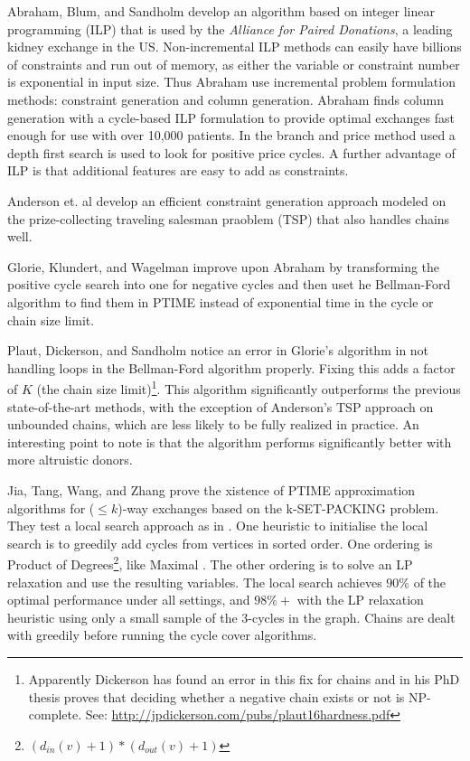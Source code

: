 \documentclass[main.tex]{subfiles}
\begin{document}
Abraham, Blum, and Sandholm \cite{Abr1} develop an algorithm based on integer linear programming (ILP) that is used by the \textit{Alliance for Paired Donations}, a leading kidney exchange in the US. Non-incremental ILP methods can easily have billions of constraints and run out of memory, as either the variable or constraint number is exponential in input size. Thus Abraham use incremental problem formulation methods: constraint generation and column generation. Abraham finds column generation with a cycle-based ILP formulation to provide optimal exchanges fast enough for use with over 10,000 patients. In the branch and price method used a depth first search is used to look for positive price cycles. A further advantage of ILP is that additional features are easy to add as constraints.

Anderson et. al \cite{And3} develop an efficient constraint generation approach modeled on the prize-collecting traveling salesman praoblem (TSP) that also handles chains well.

Glorie, Klundert, and Wagelman \cite{Glo1} improve upon Abraham \cite{Abr1} by transforming the positive cycle search into one for negative cycles and then uset he Bellman-Ford algorithm to find them in PTIME instead of exponential time in the cycle or chain size limit.

Plaut, Dickerson, and Sandholm \cite{Pla} notice an error in Glorie's algorithm \cite{Glo1} in not handling loops in the Bellman-Ford algorithm properly. Fixing this adds a factor of $K$ (the chain size limit)\footnote{Apparently Dickerson has found an error in this fix for chains and in his PhD thesis \cite{Dick} proves that deciding whether a negative chain exists or not is NP-complete. See: \url{http://jpdickerson.com/pubs/plaut16hardness.pdf}}. This algorithm significantly outperforms the previous state-of-the-art methods, with the exception of Anderson's TSP approach \cite{And3} on unbounded chains, which are less likely to be fully realized in practice. An interesting point to note is that the algorithm performs significantly better with more altruistic donors.

Jia, Tang, Wang, and Zhang \cite{Jia1} prove the xistence of PTIME approximation algorithms for ($\leq k$)-way exchanges based on the k-SET-PACKING problem. They test a local search approach as in \cite{Abb1}. One heuristic to initialise the local search is to greedily add cycles from vertices in sorted order. One ordering is Product of Degrees\footnote{$(d_{in}(v) + 1)*(d_{out}(v) + 1)$}, like Maximal \cite{Abb1}. The other ordering is to solve an LP relaxation and use the resulting variables. The local search achieves $90\%$ of the optimal performance under all settings, and $98\%+$ with the LP relaxation heuristic using only a small sample of the 3-cycles in the graph. Chains are dealt with greedily before running the cycle cover algorithms.
\end{document}
